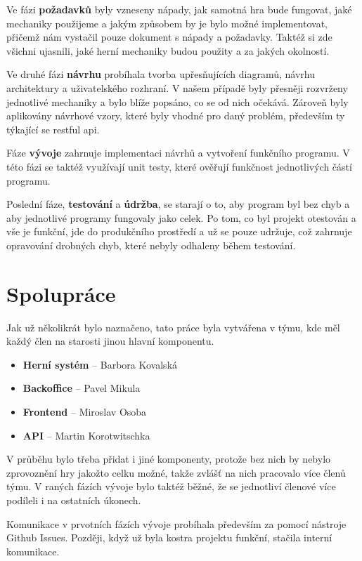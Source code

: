 Ve fázi \textbf{požadavků} byly vzneseny nápady, jak samotná hra bude fungovat, jaké mechaniky použijeme a jakým způsobem by je bylo možné implementovat, přičemž nám vystačil pouze dokument s nápady a požadavky. Taktéž si zde všichni ujasnili, jaké herní mechaniky budou použity a za jakých okolností. 

Ve druhé fázi \textbf{návrhu} probíhala tvorba upřesňujících diagramů, návrhu architektury a uživatelského rozhraní. V našem případě byly přesněji rozvrženy jednotlivé mechaniky a bylo blíže popsáno, co se od nich očekává. Zároveň byly aplikovány návrhové vzory, které byly vhodné pro daný problém, především ty týkající se \gls{restful api}.

Fáze \textbf{vývoje} zahrnuje implementaci návrhů a vytvoření funkčního programu. V této fázi se taktéž využívají unit testy, které ověřují funkčnost jednotlivých částí programu. 

Poslední fáze, \textbf{testování} a \textbf{údržba}, se starají o to, aby program byl bez chyb a aby jednotlivé programy fungovaly jako celek. Po tom, co byl projekt otestován a vše je funkční, jde do produkčního prostředí a už se pouze udržuje, což zahrnuje opravování drobných chyb, které nebyly odhaleny během testování.

\section{Spolupráce}\label{sec:collaboration}
Jak už několikrát bylo naznačeno, tato práce byla vytvářena v týmu, kde měl každý člen na starosti jinou hlavní komponentu.
\begin{itemize}[itemsep=0pt,parsep=0pt]
    \item \textbf{Herní systém} -- Barbora Kovalská
    \item \textbf{Backoffice} -- Pavel Mikula
    \item \textbf{Frontend} -- Miroslav Osoba
    \item \textbf{API} -- Martin Korotwitschka
\end{itemize}

V průběhu bylo třeba přidat i jiné komponenty, protože bez nich by nebylo zprovoznění hry jakožto celku možné, takže zvlášť na nich pracovalo více členů týmu. V raných fázích vývoje bylo taktéž běžné, že se jednotliví členové více podíleli i na ostatních úkonech. 

Komunikace v prvotních fázích vývoje probíhala především za pomocí nástroje Github Issues. Později, když už byla kostra projektu funkční, stačila interní komunikace.

